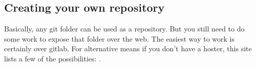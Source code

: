 \subsection{Creating your own repository}
Basically, any git folder can be used as a repository. But you still need to do some work to expose that folder over the web. The easiest way to work is certainly over gitlab. For alternative means if you don't have a hoster, this site lists a few of the possibilities: .
